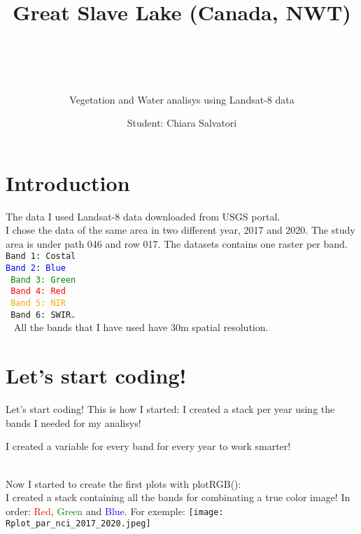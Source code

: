 \documentclass{beamer}
\title{Great Slave Lake (Canada, NWT)
\subtitle{Vegetation and Water analisys using Landsat-8 data}
\\
}
\date{}
\author{\footnotesize{Student: Chiara Salvatori}}
\institute{
 Esame: Telerilevamento Geo-Ecologico.
 
    Professore: Duccio Rocchini
    \\
 \bigskip
 \texttt{[image: great\_slave\_lake\_intro.jpg]}
}
\begin{document}
\maketitle
\section{Introduction}
\begin{frame}{The data}
    I used Landsat-8 data downloaded from USGS portal. \\ I chose the data of the same area in two different year, 2017 and 2020. The study area is under path 046 and row 017. The datasets contains one raster per band. \\ 
    \bigskip
    \texttt{\small{Band 1: Costal\\
    \textcolor{blue}{Band 2: Blue\\}
    \textcolor{green}{Band 3: Green\\}
    \textcolor{red}{Band 4: Red\\}
    \textcolor{orange}{Band 5: NIR\\}
    Band 6: SWIR. \\}
    }
    \bigskip
    All the bands that I have used have 30m spatial resolution.
\end{frame}

\section{Let's start coding!}
\begin{frame}{Let's start coding!}
 This is how I started: I created a stack per year using the bands I needed for my analisys!
 \bigskip
    \footnotesize{}
    \
\end{frame}

\begin{frame}%
 I created a variable for every band for every year to work smarter!\\
    \footnotesize{}
    \
\end{frame}
\begin{frame}%
 Now I started to create the first plots with plotRGB():\\
 I created a stack containing all the bands for combinating a true color image! In order: \textcolor{red}{Red}, \textcolor{green}{Green} and \textcolor{blue}{Blue}.
 For exemple: 
    \scriptsize{}
    \texttt{[image: Rplot\_par\_nci\_2017\_2020.jpeg]}\\
\end{frame}
\end{document}
